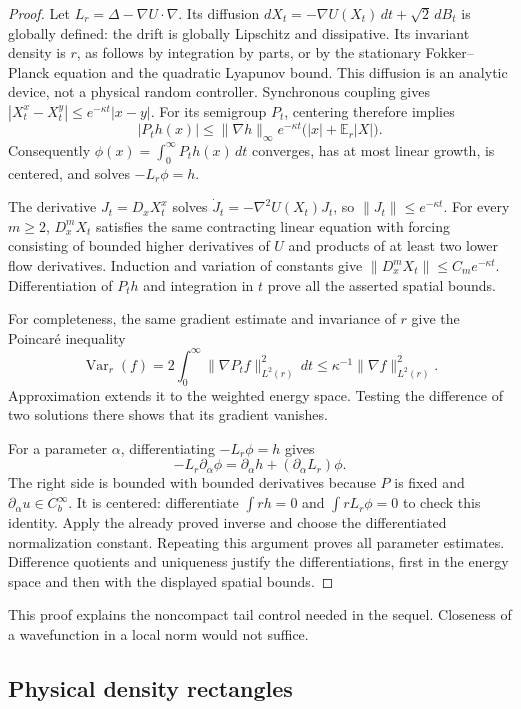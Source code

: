\documentclass[11pt]{article}
\numberwithin{equation}{section}
\theoremstyle{definition}
\newcommand{\Cb}{C_b^\infty}
\begin{document}
\begin{proof}
Let $L_r=\Delta-\nabla U\cdot\nabla$. Its diffusion
$dX_t=-\nabla U(X_t)\,dt+\sqrt2\,dB_t$ is globally defined:
the drift is globally Lipschitz and dissipative. Its invariant density
is $r$, as follows by integration by parts, or by the stationary
Fokker--Planck equation and the quadratic Lyapunov bound.
This diffusion is an analytic device, not a physical random controller.
Synchronous coupling gives
$|X_t^x-X_t^y|\leq e^{-\kappa t}|x-y|$.
For its semigroup $P_t$, centering therefore implies
\[
 |P_th(x)|\leq\|\nabla h\|_\infty e^{-\kappa t}
       \bigl(|x|+\mathbb E_r|X|\bigr).
\]
Consequently $\phi(x)=\int_0^\infty P_th(x)\,dt$ converges,
has at most linear growth, is centered, and solves $-L_r\phi=h$.

The derivative $J_t=D_xX_t^x$ solves
$\dot J_t=-\nabla^2U(X_t)J_t$, so $\|J_t\|\leq e^{-\kappa t}$.
For every $m\geq2$, $D_x^mX_t$ satisfies the same contracting
linear equation with forcing consisting of bounded higher derivatives
of $U$ and products of at least two lower flow derivatives.
Induction and variation of constants give
$\|D_x^mX_t\|\leq C_m e^{-\kappa t}$.
Differentiation of $P_th$ and integration in $t$ prove all the
asserted spatial bounds.

For completeness, the same gradient estimate and invariance of $r$
give the Poincar\'e inequality
\[
 \operatorname{Var}_r(f)
 =2\int_0^\infty\|\nabla P_tf\|_{L^2(r)}^2\,dt
 \leq\kappa^{-1}\|\nabla f\|_{L^2(r)}^2 .
\]
Approximation extends it to the weighted energy space. Testing the
difference of two solutions there shows that its gradient vanishes.

For a parameter $\alpha$, differentiating $-L_r\phi=h$ gives
\[
 -L_r\partial_\alpha\phi
  =\partial_\alpha h+(\partial_\alpha L_r)\phi.
\]
The right side is bounded with bounded derivatives because $P$
is fixed and $\partial_\alpha u\in\Cb$. It is centered:
differentiate $\int rh=0$ and $\int rL_r\phi=0$ to check this
identity. Apply the already proved inverse and choose the
differentiated normalization constant. Repeating this argument proves
all parameter estimates. Difference quotients and uniqueness justify
the differentiations, first in the energy space and then with the
displayed spatial bounds.
\end{proof}

This proof explains the noncompact tail control needed in the sequel.
Closeness of a wavefunction in a local norm would not suffice.

\subsection{Physical density rectangles}
\end{document}
